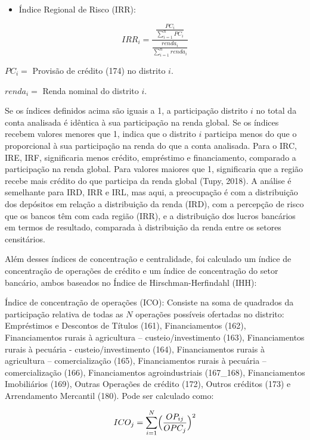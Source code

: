 \documentclass[a4paper,12pt]{article}
\providecommand{\tightlist}{%
  \setlength{\itemsep}{0pt}\setlength{\parskip}{0pt}}\usepackage{longtable,booktabs,array}
\begin{document}
\begin{itemize}
\tightlist
\item
  Índice Regional de Risco (IRR):
\end{itemize}

\begin{equation}
IRR_{i} = \frac{\frac{PC_i}{\sum_{i=1}^n PC_i}}{\frac{renda_i}{\sum_{i=1}^n renda_i}}
\end{equation}

\(PC_i =\) Provisão de crédito (174) no distrito \(i\).

\(renda_i =\) Renda nominal do distrito \(i\).

Se os índices definidos acima são iguais a 1, a participação distrito
\(i\) no total da conta analisada é idêntica à sua participação na renda
global. Se os índices recebem valores menores que 1, indica que o
distrito \(i\) participa menos do que o proporcional à sua participação
na renda do que a conta analisada. Para o IRC, IRE, IRF, significaria
menos crédito, empréstimo e financiamento, comparado a participação na
renda global. Para valores maiores que 1, significaria que a região
recebe mais crédito do que participa da renda global (Tupy, 2018). A
análise é semelhante para IRD, IRR e IRL, mas aqui, a preocupação é com
a distribuição dos depósitos em relação a distribuição da renda (IRD),
com a percepção de risco que os bancos têm com cada região (IRR), e a
distribuição dos lucros bancários em termos de resultado, comparada à
distribuição da renda entre os setores censitários.

Além desses índices de concentração e centralidade, foi calculado um
índice de concentração de operações de crédito e um índice de
concentração do setor bancário, ambos baseados no Índice de
Hirschman-Herfindahl (IHH):

Índice de concentração de operações (ICO): Consiste na soma de quadrados
da participação relativa de todas as \(N\) operações possíveis ofertadas
no distrito: Empréstimos e Descontos de Títulos (161), Financiamentos
(162), Financiamentos rurais à agricultura -- custeio/investimento
(163), Financiamentos rurais à pecuária - custeio/investimento (164),
Financiamentos rurais à agricultura -- comercialização (165),
Financiamentos rurais à pecuária -- comercialização (166),
Financiamentos agroindustriais (167\_168), Financiamentos Imobiliários
(169), Outras Operações de crédito (172), Outros créditos (173) e
Arrendamento Mercantil (180). Pode ser calculado como:

\begin{equation} \label{eq:ico}
ICO_{j} = \sum_{i=1}^N \Bigl(\frac{OP_{ij}}{OPC_{j}}\Bigr)^2
\end{equation}
\end{document}

